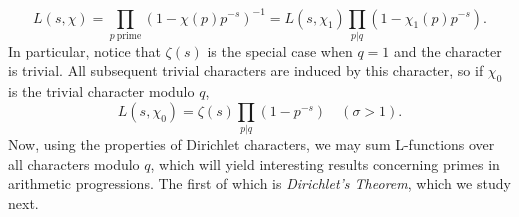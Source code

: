 \begin{equation}
\label{InducedCharacterRelation}
    L(s, \chi) = \prod_{p \ \textrm{prime}}(1 - \chi(p)p^{-s})^{-1} = L(s, \chi_1) \prod_{p \rvert q}(1 - \chi_{1}(p)p^{-s}).
\end{equation}
In particular, notice that $\zeta(s)$ is the special case when $q = 1$ and the character is trivial. All subsequent trivial characters are induced by this character, so if $\chi_0$ is the trivial character modulo $q$,
\begin{equation}
\label{LZetaRelation}
    L(s, \chi_{0}) = \zeta(s) \prod_{p \rvert q}(1 - p^{-s}) \quad (\sigma > 1). 
\end{equation}
Now, using the properties of Dirichlet characters, we may sum L-functions over all characters modulo $q$, which will yield interesting results concerning primes in arithmetic progressions. The first of which is \textit{Dirichlet's Theorem}, which we study next.